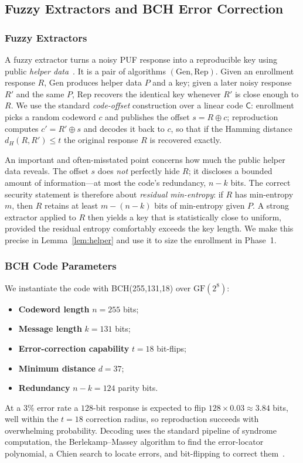 \documentclass[11pt,a4paper]{article}
\begin{document}
\subsection{Fuzzy Extractors and BCH Error Correction}
\label{subsec:bch}

\subsubsection{Fuzzy Extractors}

A fuzzy extractor turns a noisy PUF response into a reproducible key using
public \emph{helper data}~\cite{bch_puf_extraction}. It is a pair of algorithms
$(\mathrm{Gen},\mathrm{Rep})$. Given an enrollment response $R$, $\mathrm{Gen}$
produces helper data $P$ and a key; given a later noisy response $R'$ and the
same $P$, $\mathrm{Rep}$ recovers the identical key whenever $R'$ is close
enough to $R$. We use the standard \emph{code-offset} construction over a
linear code $\mathsf{C}$: enrollment picks a random codeword $c$ and publishes
the offset $s = R \oplus c$; reproduction computes $c' = R' \oplus s$ and
decodes it back to $c$, so that if the Hamming distance $d_H(R,R') \le t$ the
original response $R$ is recovered exactly.

An important and often-misstated point concerns how much the public helper data
reveals. The offset $s$ does \emph{not} perfectly hide $R$; it discloses a
bounded amount of information---at most the code's redundancy, $n-k$ bits. The
correct security statement is therefore about \emph{residual min-entropy}: if
$R$ has min-entropy $m$, then $R$ retains at least $m-(n-k)$ bits of
min-entropy given $P$. A strong extractor applied to $R$ then yields a key that
is statistically close to uniform, provided the residual entropy comfortably
exceeds the key length. We make this precise in
Lemma~\ref{lem:helper} and use it to size the enrollment in
Phase~1.

\subsubsection{BCH Code Parameters}

We instantiate the code with BCH(255,131,18) over $\mathrm{GF}(2^8)$:
\begin{itemize}[leftmargin=*]
  \item \textbf{Codeword length} $n = 255$ bits;
  \item \textbf{Message length} $k = 131$ bits;
  \item \textbf{Error-correction capability} $t = 18$ bit-flips;
  \item \textbf{Minimum distance} $d = 37$;
  \item \textbf{Redundancy} $n-k = 124$ parity bits.
\end{itemize}
At a $3\%$ error rate a $128$-bit response is expected to flip
$128 \times 0.03 \approx 3.84$ bits, well within the $t=18$ correction radius,
so reproduction succeeds with overwhelming probability. Decoding uses the
standard pipeline of syndrome computation, the Berlekamp--Massey algorithm to
find the error-locator polynomial, a Chien search to locate errors, and
bit-flipping to correct them~\cite{sram_puf_bch}.
\end{document}
